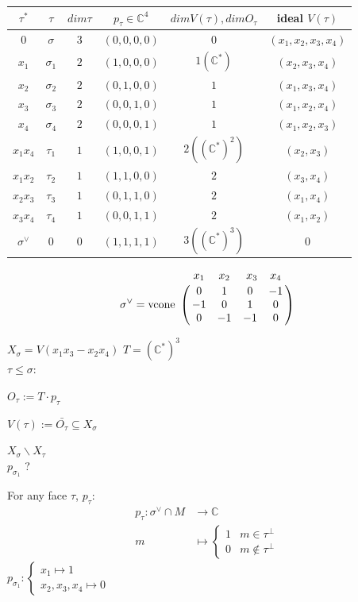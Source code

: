 \documentclass[a4paper,12pt]{amsart}
\newcommand{\C}{\ensuremath{\mathbb{C}}}
\begin{document}
\begin{center}
	\begin{tabular}{ |c|c|c|c|c|c|} 
		\hline
		$\tau^*$ & $\tau$ & $dim\tau$ & $p_\tau \in \C^4$ & $dim V(\tau), dim O_\tau$ & ideal $V(\tau)$ \\
		\hline
		$0$ & $\sigma$ & $3$ & $(0,0,0,0)$ & $0$ & $(x_1,x_2,x_3,x_4)$ \\ 
		$x_1$ & $\sigma_1$ & $2$ & $(1,0,0,0)$ & $1 (\C^*)$ & $(x_2,x_3,x_4)$ \\
		$x_2$ & $\sigma_2$ & $2$ & $(0,1,0,0)$ & $1 $ & $(x_1,x_3,x_4)$ \\
		$x_3$ & $\sigma_3$ & $2$ & $(0,0,1,0)$ & $1 $ & $(x_1,x_2,x_4)$ \\
		$x_4$ & $\sigma_4$ & $2$ & $(0,0,0,1)$ & $1 $ & $(x_1,x_2,x_3)$ \\
		$x_1x_4$ & $\tau_1$ & $1$ & $(1,0,0,1)$ & $ 2 ((\C^*)^2) $ & $(x_2,x_3)$ \\
		$x_1x_2$ & $\tau_2$ & $1$ & $(1,1,0,0)$ & $2 $ & $(x_3,x_4)$ \\
		$x_2x_3$ & $\tau_3$ & $1$ & $(0,1,1,0)$ & $2 $ & $(x_1,x_4)$ \\
		$x_3x_4$ & $\tau_4$ & $1$ & $(0,0,1,1)$ & $2 $ & $(x_1,x_2)$ \\
		$\sigma^\vee$ & $0$ & $0$ & $(1,1,1,1)$ & $3 ((\C^*)^3) $ & $0$ \\
		\hline
	\end{tabular}
\end{center}


$$\sigma^\vee=\text{vcone}\bordermatrix{& x_1 & x_2 &\ x_3 & x_4 \cr
	& 0 &  1  & 0 & -1 \cr
	& -1  &  0 & 1 & 0 \cr
	& 0 & -1 & -1 & 0 }$$

$X_\sigma=V(x_1x_3-x_2x_4)$
$T=(\C^*)^3$
\\

$\tau\leq \sigma$:

$O_\tau:=T\cdot p_\tau$

$V(\tau):= \bar{O_\tau}\subseteq X_\sigma$ 

$X_\sigma\backslash X_\tau$
\\

$ p_{\sigma_1} $ ?

For any face $ \tau $, $p_\tau:$
\begin{align*}
	p_\tau : \sigma^\vee \cap M &\to \C\\
	m &\mapsto \begin{cases}
	1 & m\in \tau^\perp \\
	0 & m\not\in \tau^\perp
	\end{cases}
\end{align*}
$p_{\sigma_1}: \begin{cases}
x_1\mapsto 1 \\ x_2,x_3,x_4 \mapsto 0
\end{cases}$
\end{document}
